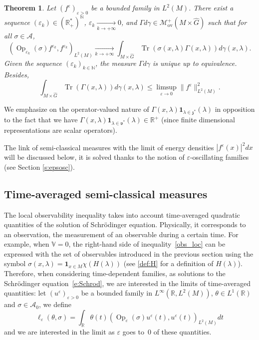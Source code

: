 \documentclass[10pt]{amsart}
\let\mathcal\mathscr
\newcommand{\rov}{\mathrm{ov}}
\newcommand{\bun}{\mathbf{1}}
\DeclareMathOperator{\Op}{Op}
\DeclareMathOperator{\Tr}{Tr}
\theoremstyle{plain}
\newtheorem{theorem}{Theorem}[section]
\theoremstyle{definition}
\let\eps\varepsilon
\def\R{{\mathbb R}}
\def\N{{\mathbb N}}
\def\bbV{{\mathbb V}}
\begin{document}
\begin{theorem}
Let $(f^\eps)_{\eps>0}$ be a bounded family in $L^2(M)$. There exist a sequence $(\eps_k)\in(\R_+^*)^{\N}$, $\eps_k \underset{k\to +\infty}{\longrightarrow} 0$, and $ \Gamma d\gamma\in \mathcal{M}_{\rov}^+(M\times \widehat{G})$ such that for all $\sigma\in\mathcal{A}$,
\begin{equation*}
(\Op_{\eps_k}(\sigma)f^{\eps_k},f^{\eps_k})_{L^2(M)} \underset{k\to +\infty}{\longrightarrow} \int_{M\times\widehat{G}} \Tr(\sigma(x,\lambda)\Gamma(x,\lambda))d\gamma(x,\lambda).
\end{equation*}
Given the sequence $(\eps_k)_{k\in\N}$, the measure $ \Gamma d\gamma$ is unique up to equivalence. Besides,
\begin{equation*}
\int_{M\times \widehat{G}}\Tr(\Gamma(x,\lambda))d\gamma(x,\lambda)\leq \limsup_{\eps\to 0}\|f^\eps\|^2_{L^2(M)}.
\end{equation*}
\end{theorem}

We emphasize on the operator-valued nature of $\Gamma (x,\lambda) \bun_{\lambda\in \mathfrak z^*}(\lambda)$ in opposition to the fact that we have
$\Gamma (x,\lambda) \bun_{\lambda\in \mathfrak v^*}(\lambda)\in \R^+$ (since finite dimensional representations are scalar operators).

The link of semi-classical measures with the limit of energy densities $|f^\eps(x)|^2 dx$ will be discussed below, it is solved thanks to the notion of $\eps$-oscillating families (see Section \ref{s:epsosc}).

\subsection{Time-averaged semi-classical measures}
\label{s:sclmeastime}
The local observability inequality takes into account time-averaged quadratic quantities of the solution of Schrödinger equation. Physically, it corresponds to an observation, \ie the measurement of an observable during a certain time. For example, when $\bbV=0$, the right-hand side of inequality~\eqref{obs_loc} can be expressed with the set of observables introduced in the previous section using the symbol $\sigma(x,\lambda)= \bun_{x\in M} \chi (H(\lambda))$ (see \eqref{def:H} for a definition of $H(\lambda)$). Therefore, when considering time-dependent families, as solutions to the Schrödinger equation~\eqref{e:Schrod}, we are interested in the limits of time-averaged quantities: let $(u^\eps)_{\eps>0}$ be a bounded family in $L^\infty(\R,L^2(M))$, $\theta\in L^1(\R)$ and $\sigma\in {{\mathcal A}_0}$, we define
\[
\ell_\eps(\theta, \sigma) = \int_{\R} \theta(t) \left(\Op_\eps(\sigma) u^\eps(t),u^\eps(t)\right) _{L^2(M)} dt
\]
and we are interested in the limit as $\eps$ goes to~$0$ of these quantities.
\end{document}
